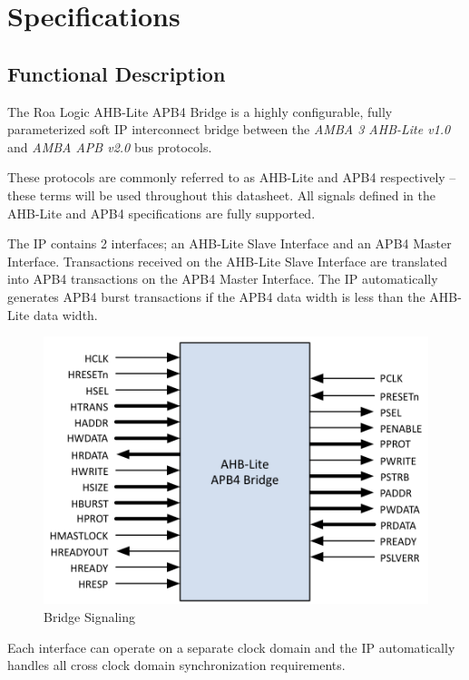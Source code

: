 \chapter{Specifications}\label{specifications}

\section{Functional Description}\label{functional-description}

The
Roa Logic AHB-Lite APB4 Bridge is a highly configurable, fully
parameterized soft IP interconnect bridge between the \emph{AMBA 3
AHB-Lite v1.0} and \emph{AMBA APB v2.0} bus protocols.

These protocols are commonly referred to as AHB-Lite and APB4
respectively -- these terms will be used throughout this datasheet. All
signals defined in the AHB-Lite and APB4 specifications are fully
supported.

The IP contains 2 interfaces; an AHB-Lite Slave Interface and an APB4
Master Interface. Transactions received on the AHB-Lite Slave Interface
are translated into APB4 transactions on the APB4 Master Interface. The
IP automatically generates APB4 burst transactions if the APB4 data
width is less than the AHB-Lite data width.

\begin{figure}[tbh]
	\centering
	\includegraphics{assets/img/apb4-bridge-sig.png}
	\caption{Bridge Signaling}
	\label{fig:apb4-bridge-sig}
\end{figure}

Each interface can operate on a separate clock domain and the IP
automatically handles all cross clock domain synchronization
requirements.


